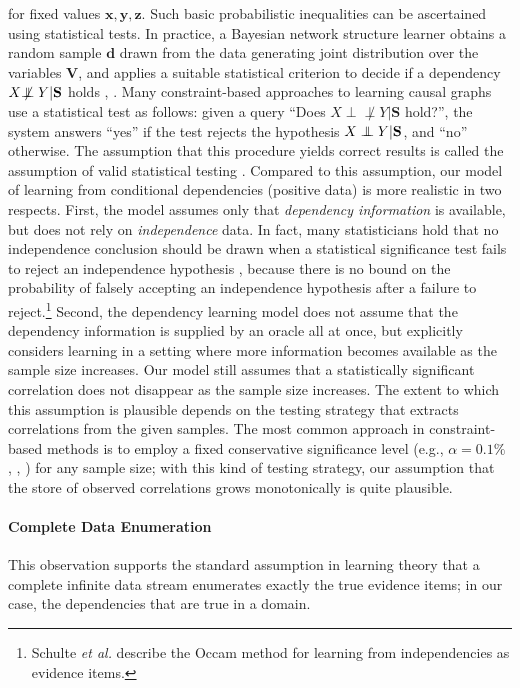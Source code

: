 \documentclass{elsarticle}%
\renewcommand{\d}{\mathbf{d}}
\newcommand{\set}[1]{\mathbf{#1}}
\newcommand{\indep}{\ensuremath{\perp{}\!\!\!\!\!\!\!\perp{}}}
\newcommand{\dep}{\ensuremath{{\perp{}\!\!\!\!\!\!\!\not  \perp{}}}}
\newcommand{\x}{x}
\newcommand{\y}{y}
\newcommand{\z}{z}
\begin{document}
for fixed values $\set{\x},\set{\y},\set{\z}$. Such basic probabilistic inequalities can be ascertained  using statistical tests. In practice, a Bayesian network structure learner obtains a random sample $\d$
drawn from the data generating joint distribution over the variables $\mathbf{V}$,
and applies a suitable statistical criterion to decide if a dependency $X \protect\dep Y | \mathbf{S}$ holds \cite{peter00:_causat}, \cite[Sec.4]{bib:max-min}. Many constraint-based approaches to learning causal graphs use a statistical test as follows: given a query ``Does $X \dep Y | \mathbf{S}$ hold?'', the system answers ``yes'' if the test rejects the hypothesis $X \protect\indep Y | \mathbf{S}$, and 
``no'' otherwise. The assumption that this procedure yields correct results is called the assumption of valid statistical testing
\cite[Sect.6.2]{cooper99:_comput_causat_discov}.
Compared to this assumption, our model of learning from conditional dependencies (positive data) is  more realistic in two respects. First, the model assumes only that \emph{dependency information} is available,
but does not rely on
{\em independence} data. In fact, many statisticians hold that no independence conclusion
should be drawn when a statistical significance test fails to reject an independence hypothesis \cite{giere72:_signif_test_contr}, because there is no bound on the probability of falsely accepting an independence hypothesis after a failure to reject.\footnote{Schulte {\em et al.} \cite{Schulte2010} describe the Occam method for learning from independencies as evidence items.} Second, the dependency learning model does not assume that the dependency information is supplied by an oracle all at once, but explicitly considers learning in a setting where more information becomes available as the sample size increases. Our model still assumes that a statistically significant correlation does not disappear as the sample size increases.  The extent to  which this assumption is plausible depends on the testing strategy that extracts correlations from the given samples. The most common approach in constraint-based methods is to employ a fixed conservative significance level (e.g., $\alpha = 0.1\%$ 
\cite[Ch.5]{peter00:_causat}, \cite{campos06:_bayes}, \cite{bib:max-min}) for any sample size; with this kind of testing strategy, our assumption that the store of observed correlations grows monotonically is quite plausible. 

\paragraph{Complete Data Enumeration} This observation supports the standard assumption in learning theory that a complete infinite data stream enumerates exactly the true evidence items; in our case, the dependencies that are true in a domain. 
\end{document}
